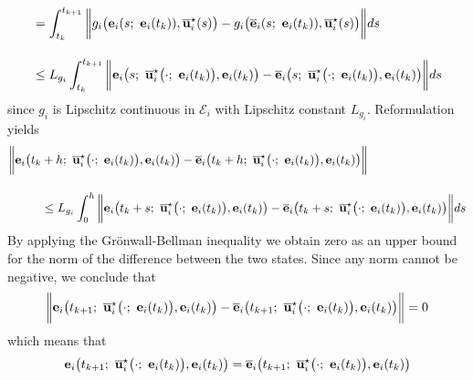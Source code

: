 \begin{gg_box}
\begin{align}
  &=\int_{t_k}^{t_{k+1}} \bigg\| g_i\big(\vect{e}_i(s;\ \vect{e}_i(t_k)), \overline{\vect{u}}_i^{\star}(s)\big)
  - g_i\big(\overline{\vect{e}}_i(s;\ \vect{e}_i(t_k)), \overline{\vect{u}}_i^{\star}(s)\big) \bigg\| ds\\[2.5ex]
  &\leq L_{g_i}\int_{t_k}^{t_{k+1}} \bigg\|
    \vect{e}_i\big(s;\ \overline{\vect{u}}_i^{\star}\big(\cdot;\ \vect{e}_i(t_k)\big), \vect{e}_i(t_k)\big)
    -\overline{\vect{e}}_i\big(s;\ \overline{\vect{u}}_i^{\star}\big(\cdot;\ \vect{e}_i(t_k)\big), \vect{e}_i(t_k)\big) \bigg\| ds
\end{align}
since $g_i$ is Lipschitz continuous in $\mathcal{E}_i$ with Lipschitz constant
$L_{g_i}$. Reformulation yields
\begin{align}
  \bigg\|\vect{e}_i\big(t_k&+h;\ \overline{\vect{u}}_i^{\star}\big(\cdot;\ \vect{e}_i(t_k)\big), \vect{e}_i(t_k)\big)
    -\overline{\vect{e}}_i\big(t_k+h;\ \overline{\vect{u}}_i^{\star}\big(\cdot;\ \vect{e}_i(t_k)\big), \vect{e}_i(t_k)\big) \bigg\| \\[2.5ex]
  &\leq L_{g_i}\int_{0}^{h} \bigg\|
    \vect{e}_i\big(t_k + s;\ \overline{\vect{u}}_i^{\star}\big(\cdot;\ \vect{e}_i(t_k)\big), \vect{e}_i(t_k)\big)
    -\overline{\vect{e}}_i\big(t_k + s;\ \overline{\vect{u}}_i^{\star}\big(\cdot;\ \vect{e}_i(t_k)\big), \vect{e}_i(t_k)\big) \bigg\| ds
\end{align}
By applying the Gr\"{o}nwall-Bellman inequality we obtain zero as an
upper bound for the norm of the difference between the two states. Since
any norm cannot be negative, we conclude that
\begin{align}
  \bigg\|\vect{e}_i\big(t_{k+1};\ \overline{\vect{u}}_i^{\star}\big(\cdot;\ \vect{e}_i(t_k)\big), \vect{e}_i(t_k)\big)
    -\overline{\vect{e}}_i\big(t_{k+1};\ \overline{\vect{u}}_i^{\star}\big(\cdot;\ \vect{e}_i(t_k)\big), \vect{e}_i(t_k)\big) \bigg\| = 0
\end{align}
which means that
\begin{align}
  \vect{e}_i\big(t_{k+1};\ \overline{\vect{u}}_i^{\star}\big(\cdot;\ \vect{e}_i(t_k)\big), \vect{e}_i(t_k)\big)
    =\overline{\vect{e}}_i\big(t_{k+1};\ \overline{\vect{u}}_i^{\star}\big(\cdot;\ \vect{e}_i(t_k)\big), \vect{e}_i(t_k)\big)
\end{align}


\end{gg_box}
